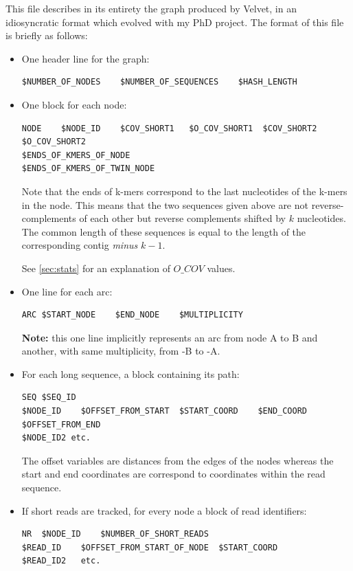 \documentclass{article}
\begin{document}
This file describes in its entirety the graph produced by Velvet, in an idiosyncratic format which evolved with my PhD project. The format of this file is briefly as follows:

\begin{itemize}
\item One header line for the graph: 
\begin{verbatim}
$NUMBER_OF_NODES    $NUMBER_OF_SEQUENCES    $HASH_LENGTH
\end{verbatim}

\item One block for each node:
\begin{verbatim}
NODE    $NODE_ID    $COV_SHORT1   $O_COV_SHORT1  $COV_SHORT2  $O_COV_SHORT2
$ENDS_OF_KMERS_OF_NODE
$ENDS_OF_KMERS_OF_TWIN_NODE
\end{verbatim}

Note that the ends of k-mers correspond to the last nucleotides of the k-mers in the node. This means that the two sequences given above are not reverse-complements of each other but reverse complements shifted by $k$ nucleotides. The common length of these sequences is equal to the length of the corresponding contig \emph{minus} $k-1$.

See \ref{sec:stats} for an explanation of $O\_COV$ values.

\item One line for each arc:
\begin{verbatim}
ARC $START_NODE    $END_NODE    $MULTIPLICITY
\end{verbatim}

\textbf{Note:} this one line implicitly represents an arc from node A to B and another, with same multiplicity, from -B to -A.

\item For each long sequence, a block containing its path:
\begin{verbatim}
SEQ	$SEQ_ID
$NODE_ID	$OFFSET_FROM_START	$START_COORD	$END_COORD	$OFFSET_FROM_END
$NODE_ID2 etc.
\end{verbatim}

The offset variables are distances from the edges of the nodes whereas the start and end coordinates are correspond to coordinates within the read sequence.

\item If short reads are tracked, for every node a block of read identifiers:
\begin{verbatim}
NR	$NODE_ID	$NUMBER_OF_SHORT_READS
$READ_ID	$OFFSET_FROM_START_OF_NODE	$START_COORD
$READ_ID2	etc.
\end{verbatim}
\end{itemize}
\end{document}
